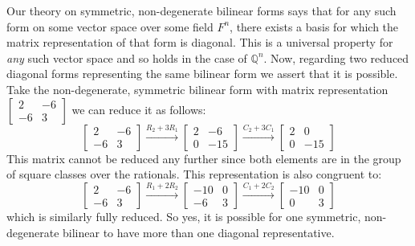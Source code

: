 \documentclass[11pt]{article}
\newcommand{\Q}{\mathbb{Q}}
\begin{document}
\begin{problem}
\begin{parts}
    \begin{solution}
      Our theory on symmetric, non-degenerate bilinear forms says
      that for any such form on some vector space over some field \(
      F^n \), there exists a basis for which the matrix
      representation of that form is diagonal. This is a universal
      property for \emph{any} such vector space and so holds in the
      case of \( \Q^n \). Now, regarding two reduced diagonal forms
      representing the same bilinear form we assert that it is possible.
      Take the non-degenerate, symmetric bilinear form with matrix
      representation \(
        \begin{bmatrix}
          2 & -6 \\
          -6 & 3
      \end{bmatrix} \) we can reduce it as follows:
      \[
        \begin{bmatrix}
          2 & -6 \\
          -6 & 3
        \end{bmatrix}\xrightarrow{R_2 + 3R_1}
        \begin{bmatrix}
          2 & -6 \\
          0 & -15
        \end{bmatrix}\xrightarrow{C_2 + 3C_1}
        \begin{bmatrix}
          2 & 0 \\
          0 & -15
        \end{bmatrix}
      \]
      This matrix cannot be reduced any further since both elements
      are in the group of square classes over the rationals. This
      representation is also congruent to:
      \[
        \begin{bmatrix}
          2 & -6 \\
          -6 & 3
        \end{bmatrix}\xrightarrow{R_1 + 2R_2}
        \begin{bmatrix}
          -10 & 0 \\
          -6 & 3
        \end{bmatrix}\xrightarrow{C_1 + 2C_2}
        \begin{bmatrix}
          -10 & 0 \\
          0 & 3
        \end{bmatrix}
      \]
      which is similarly fully reduced. So yes, it is possible for
      one symmetric, non-degenerate bilinear to have more than one
      diagonal representative.
    \end{solution}

  \end{parts}
\end{problem}
\end{document}

